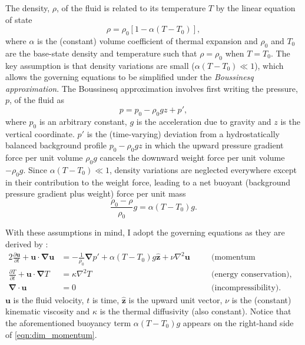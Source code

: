 \documentclass[titlepage,twoside]{article}
\numberwithin{equation}{section}
\newcommand{\pdiff}[2]{\frac{\partial #1}{\partial #2}}
\renewcommand\vec{\bm}
\newcommand{\uvec}[1]{\vec{\hat{#1}}}
\newcommand{\grad}{\vec{\nabla}}
\begin{document}
The density, $\rho$, of the fluid is related to its temperature $T$ by
the linear equation of state
\[
    \rho = \rho_0 [1 - \alpha(T - T_0)],
\]
where $\alpha$ is the (constant) volume coefficient of thermal expansion and
$\rho_0$ and $T_0$ are the base-state density and temperature such that $\rho =
\rho_0$ when $T = T_0$. The key assumption is that density variations are small
($\alpha (T - T_0) \ll 1$), which allows the governing equations to be
simplified under the \emph{Boussinesq approximation}. The Boussinesq
approximation involves first writing the pressure, $p$, of the fluid as
\[
    p = p_0 - \rho_0 gz + p',
\]
where $p_0$ is an arbitrary constant, $g$ is the acceleration due to gravity
and $z$ is the vertical coordinate. $p'$ is the (time-varying) deviation from
a hydrostatically balanced background profile $p_0 - \rho_0 gz$
in which the upward pressure gradient force per unit volume $\rho_0 g$ cancels
the downward weight force per unit volume $-\rho_0 g$. Since
$\alpha (T - T_0) \ll 1$, density variations are neglected everywhere except
in their contribution to the weight force, leading to a net buoyant
(background pressure gradient plus weight) force per unit mass
\[
    \frac{\rho_0 - \rho}{\rho_0} g = \alpha (T - T_0) g.
\]

With these assumptions in mind, I adopt the governing equations as they
are derived by \textcite{chandrasekhar1961}:
\begin{alignat}{2}
    \label{eqn:dim_momentum}
    \pdiff{\vec{u}}{t} + \vec{u} \cdot \grad \vec{u}
        &= -\frac{1}{\rho_0} \grad p' + \alpha (T - T_0) g \uvec{z}
        + \nu \nabla^2 \vec{u}
    &\quad& \text{(momentum conservation),} \\
    \label{eqn:dim_energy}
    \pdiff{T}{t} + \vec{u} \cdot \grad T
        &= \kappa \nabla^2 T
    && \text{(energy conservation), and} \\
    \label{eqn:dim_incompressible}
    \grad \cdot \vec{u} &= 0
    && \text{(incompressibility).}
\end{alignat}
$\vec{u}$ is the fluid velocity, $t$ is time, $\uvec{z}$ is the upward
unit vector, $\nu$ is the (constant) kinematic viscosity and $\kappa$ is
the thermal diffusivity (also constant). Notice that the aforementioned
buoyancy term $\alpha (T - T_0) g$ appears on the right-hand side of
\cref{eqn:dim_momentum}.
\end{document}
